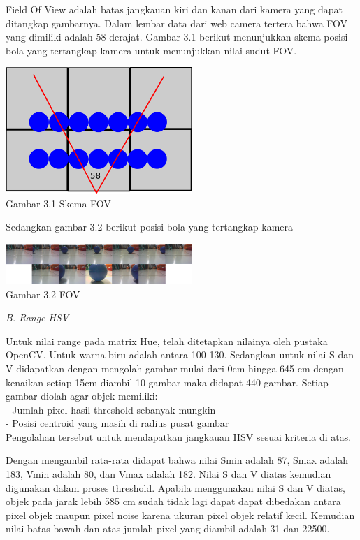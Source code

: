 \documentclass[10pt,journal,compsoc]{IEEEtran}
\begin{document}
  Field Of View adalah batas jangkauan kiri dan kanan dari kamera yang dapat ditangkap gambarnya.
  Dalam lembar data dari web camera tertera bahwa FOV yang dimiliki adalah 58 derajat.
  Gambar 3.1 berikut menunjukkan skema posisi bola yang tertangkap kamera untuk menunjukkan nilai sudut FOV.
  \begin{center}
    \includegraphics[width=200pt]{fov}\\
    Gambar 3.1 Skema FOV
  \end{center}
  Sedangkan gambar 3.2 berikut posisi bola yang tertangkap kamera
  \begin{center}
    \includegraphics[width=200pt]{data_fov}\\
    Gambar 3.2 FOV
  \end{center}
  
  \noindent \textit{B. Range HSV}
  
  Untuk nilai range pada matrix Hue, telah ditetapkan nilainya oleh pustaka OpenCV.
  Untuk warna biru adalah antara 100-130.
  Sedangkan untuk nilai S dan V didapatkan dengan mengolah gambar mulai dari 0cm hingga 645 cm dengan kenaikan setiap 15cm diambil 10 gambar maka didapat 440 gambar.
  Setiap gambar diolah agar objek memiliki:\\
  - Jumlah pixel hasil threshold sebanyak mungkin\\
  - Posisi centroid yang masih di radius pusat gambar\\
 Pengolahan tersebut untuk mendapatkan jangkauan HSV sesuai kriteria di atas.
 
  Dengan mengambil rata-rata didapat bahwa nilai Smin adalah 87, Smax adalah 183, Vmin adalah 80, dan Vmax adalah 182.
  Nilai S dan V diatas kemudian digunakan dalam proses threshold.
  Apabila menggunakan nilai S dan V diatas, objek pada jarak lebih 585 cm sudah tidak lagi dapat dapat dibedakan antara pixel objek maupun pixel noise karena ukuran pixel objek relatif kecil.
  Kemudian nilai batas bawah dan atas jumlah pixel yang diambil adalah 31 dan 22500.
  
\end{document}
